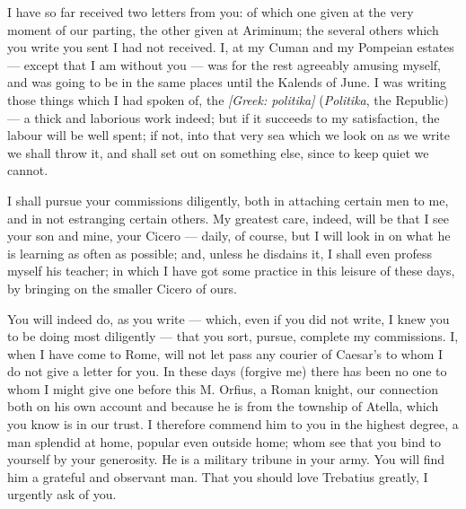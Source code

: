 

 I have so far received two letters from you: of which one given at the very moment of our parting, the other given at Ariminum; the several others which you write you sent I had not received. I, at my Cuman and my Pompeian estates --- except that I am without you --- was for the rest agreeably amusing myself, and was going to be in the same places until the Kalends of June. I was writing those things which I had spoken of, the \textit{[Greek: politika]} (\textit{Politika}, the Republic) --- a thick and laborious work indeed; but if it succeeds to my satisfaction, the labour will be well spent; if not, into that very sea which we look on as we write we shall throw it, and shall set out on something else, since to keep quiet we cannot.

 I shall pursue your commissions diligently, both in attaching certain men to me, and in not estranging certain others. My greatest care, indeed, will be that I see your son and mine, your Cicero --- daily, of course, but I will look in on what he is learning as often as possible; and, unless he disdains it, I shall even profess myself his teacher; in which I have got some practice in this leisure of these days, by bringing on the smaller Cicero of ours.

 You will indeed do, as you write --- which, even if you did not write, I knew you to be doing most diligently --- that you sort, pursue, complete my commissions. I, when I have come to Rome, will not let pass any courier of Caesar's to whom I do not give a letter for you. In these days (forgive me) there has been no one to whom I might give one before this M. Orfius, a Roman knight, our connection both on his own account and because he is from the township of Atella, which you know is in our trust. I therefore commend him to you in the highest degree, a man splendid at home, popular even outside home; whom see that you bind to yourself by your generosity. He is a military tribune in your army. You will find him a grateful and observant man. That you should love Trebatius greatly, I urgently ask of you.

